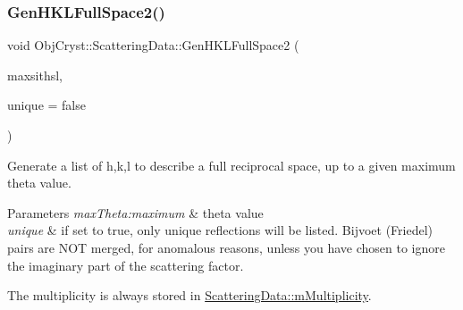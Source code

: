 \subsubsection{\texorpdfstring{GenHKLFullSpace2()}{GenHKLFullSpace2()}}
{\footnotesize\ttfamily void Obj\+Cryst\+::\+Scattering\+Data\+::\+Gen\+H\+K\+L\+Full\+Space2 (\begin{DoxyParamCaption}\item[{const R\+E\+AL}]{maxsithsl,  }\item[{const bool}]{unique = {\ttfamily false} }\end{DoxyParamCaption})\hspace{0.3cm}{\ttfamily [virtual]}}



Generate a list of h,k,l to describe a full reciprocal space, up to a given maximum theta value. 


\begin{DoxyParams}{Parameters}
{\em max\+Theta\+:maximum} & theta value \\
\hline
{\em unique} & if set to true, only unique reflections will be listed. Bijvoet (Friedel) pairs are N\+OT merged, for \textquotesingle{}anomalous\textquotesingle{} reasons, unless you have chosen to ignore the imaginary part of the scattering factor.\\
\hline
\end{DoxyParams}
The multiplicity is always stored in \mbox{\hyperlink{class_obj_cryst_1_1_scattering_data_affaae453ef7ac110ab7a1f0abb2c50a7}{Scattering\+Data\+::m\+Multiplicity}}.

